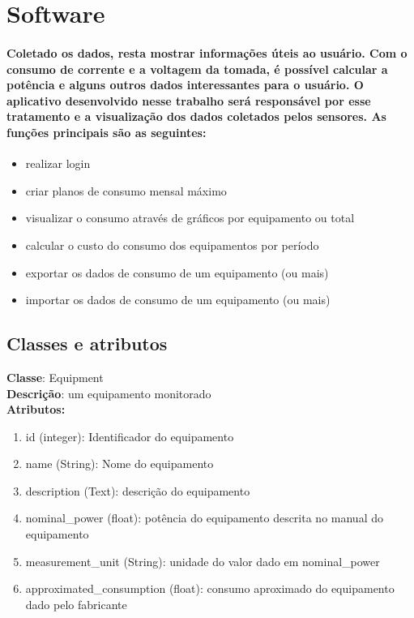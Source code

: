 \section{Software}
\label{Sec:software}
\paragraph{
Coletado os dados, resta mostrar informações úteis ao usuário. Com o consumo de corrente e a voltagem da tomada, é possível calcular a potência e alguns outros dados interessantes para o usuário. O aplicativo desenvolvido nesse trabalho será responsável por esse tratamento e a visualização dos dados coletados pelos sensores. As funções principais são as seguintes:
}
\begin{itemize}
\item{realizar login}
\item{criar planos de consumo mensal máximo}
\item{visualizar o consumo através de gráficos por equipamento ou total}
\item{calcular o custo do consumo dos equipamentos por período}
\item{exportar os dados de consumo de um equipamento (ou mais)}
\item{importar os dados de consumo de um equipamento (ou mais)}
\end{itemize}
\subsection{Classes e atributos}
\textbf{Classe}: Equipment\\
\textbf{Descrição}: um equipamento monitorado\\	
\textbf{Atributos:}
\begin{enumerate}
  \item id (integer): Identificador do equipamento
  \item name (String): Nome do equipamento
  \item description (Text): descrição do equipamento 
  \item nominal\_power (float): potência do equipamento descrita no manual do equipamento 
  \item measurement\_unit (String): unidade do valor dado em nominal\_power
  \item approximated\_consumption (float): consumo aproximado do equipamento dado pelo fabricante 
\end{enumerate}

